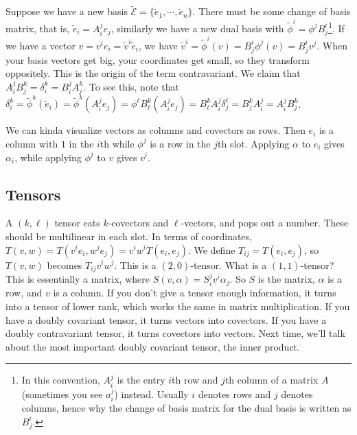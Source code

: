 Suppose we have a new basis $\widetilde {\mathcal{E}}= \{\widetilde e_1,\cdots , \widetilde e_n \}  $. There must be some change of basis matrix, that is, $\widetilde e_i = A_i ^j e_j $, similarly we have a new dual basis with $\widetilde \phi^i =\phi^jB^i _j $\footnote{In this convention, $A_i ^j $ is the entry $i$th row and $j$th column of a matrix $A$ (sometimes you see $a_i ^j $) instead. Usually $i$ denotes rows and $j$ denotes columns, hence why the change of basis matrix for the dual basis is written as $B_j ^i $.}. If we have a vector $v=v^i e_i =\widetilde v^i \widetilde e_i $, we have $\widetilde v^i =\widetilde \phi^i (v)=B^i _j \phi^j(v)=B^i _j v^j$. When your basis vectors get big, your coordinates get small, so they transform oppositely. This is the origin of the term contravariant. We claim that $A_i ^j B_j ^k= \delta _i ^k=B_i ^j A_j ^k$. To see this, note that $\delta_i ^k= \widetilde \phi^k(\widetilde e_i )=\widetilde \phi^k(A_i^je_j )=\phi^{\ell}B_{\ell}^k (A_i ^je_j )=B_{\ell}^kA_i ^j \delta _j ^{\ell}=B_j ^kA_i ^j=A_i ^jB_j ^k$. 

We can kinda visualize vectors as columns and covectors as rows. Then $e_i $ is a column with $1$ in the $i$th while $\phi^j$ is a row in the $j$th slot. Applying $\alpha $ to $e_i $ gives $\alpha _i $, while applying $\phi^j$ to $v$ gives $v^i $.
\subsection{Tensors}
A $(k,\ell)$ tensor eats $k$-covectors and $\ell$-vectors, and pops out a number. These should be multilinear in each slot. In terms of coordinates, $T(v,w)=T(v^i e_i ,w^je_j )=v^i w^i T(e_i ,e_j )$. We define $T_{ij}=T(e_i ,e_j )$, so $T(v,w)$ becomes $T_{ij}v^i w^j$. This is a $(2,0)$-tensor. What is a $(1,1)$-tensor? This is essentially a matrix, where $S(v,\alpha )=S_i ^j v^i \alpha _j $. So $S$ is the matrix, $\alpha $ is a row, and $v$ is a column. If you don't give a tensor enough information, it turns into a tensor of lower rank, which works the same in matrix multiplication. If you have a doubly covariant tensor, it turns vectors into covectors. If you have a doubly contravariant tensor, it turns covectors into vectors. Next time, we'll talk about the most important doubly covariant tensor, the inner product.
